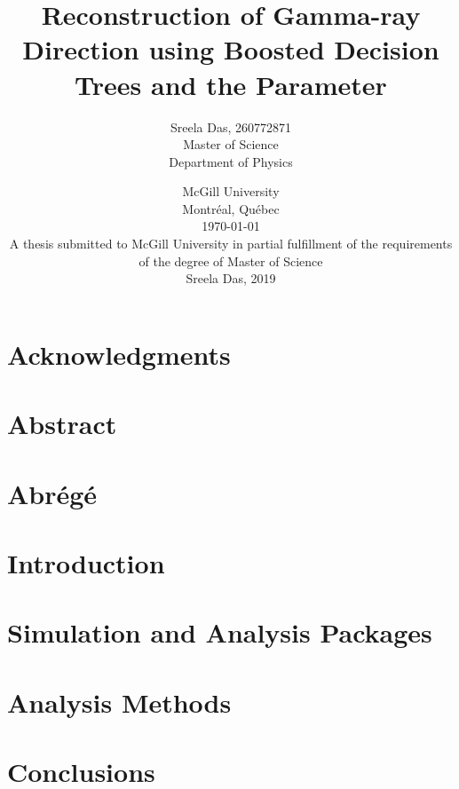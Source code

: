 \documentclass[openany, oneside, 12pt]{book}
\title{\Huge Reconstruction of Gamma-ray Direction using Boosted Decision Trees and the \disp Parameter \vspace{14pt}}
\author{\Large Sreela Das, 260772871 \\ \large Master of Science \\ \large Department of Physics \vspace{33pt}}
\date{\large McGill University \\ \large Montr\'eal, Qu\'ebec \\ \large \today \vspace{33pt}\\
  A thesis submitted to McGill University in partial fulfillment of the requirements of the degree of Master of Science\\ \vspace{30pt}\textcopyright \hspace{5pt}Sreela Das, 2019}
\begin{document}
\clearpage
\frontmatter
\renewcommand{\chaptermark}[1]{\markboth{\MakeUppercase{\chaptername\ \thechapter.\ #1}}{}}
\maketitle
\clearpage
{}
\raggedright
\chapter{Acknowledgments}

\clearpage
\chapter{Abstract}

\clearpage
\chapter{Abr\'eg\'e}
% 
\clearpage
\tableofcontents
\listoffigures
\listoftables
\mainmatter
\raggedbottom

\setlength\parindent{24pt}
\setlength\parskip{10pt}
\pagestyle{plain}

\chapter{Introduction}


\chapter{Simulation and Analysis Packages}


\chapter{Analysis Methods}


% 

\chapter{Conclusions}



% 

%  

% 



\end{document}
